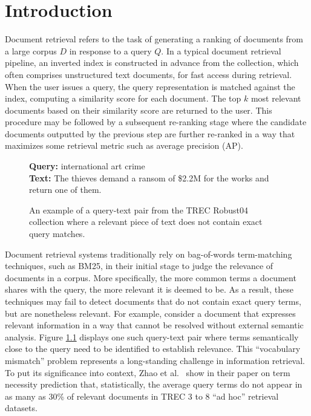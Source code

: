 \chapter{Introduction}
\label{intro}

Document retrieval refers to the task of generating a ranking of documents from a large corpus $ D $ in response to a query $ Q $.
In a typical document retrieval pipeline, an inverted index is constructed in advance from the collection, which often comprises unstructured text documents, for fast access during retrieval.
When the user issues a query, the query representation is matched against the index, computing a similarity score for each document.
The top $ k $ most relevant documents based on their similarity score are returned to the user.
This procedure may be followed by a subsequent re-ranking stage where the candidate documents outputted by the previous step are further re-ranked in a way that maximizes some retrieval metric such as average precision (AP).

\begin{figure}[b!]
	\begin{framed}
    		\textbf{Query:} international art crime \\
    		\textbf{Text:} The thieves demand a ransom of \$2.2M for the works and return one of them.
	\end{framed}
\label{query-sent-example}
 \caption{An example of a query-text pair from the TREC Robust04 collection where a relevant piece of text does not contain exact query matches.}
\end{figure}

Document retrieval systems traditionally rely on bag-of-words term-matching techniques, such as BM25, in their initial stage to judge the relevance of documents in a corpus.
More specifically, the more common terms a document shares with the query, the more relevant it is deemed to be.
As a result, these techniques may fail to detect documents that do not contain exact query terms, but are nonetheless relevant.
For example, consider a document that expresses relevant information in a way that cannot be resolved without external semantic analysis.
Figure \ref{query-sent-example} displays one such query-text pair where terms semantically close to the query need to be identified to establish relevance.
This ``vocabulary mismatch'' problem represents a long-standing challenge in information retrieval.
To put its significance into context, Zhao et al.~\cite{zhao2010term} show in their paper on term necessity prediction that, statistically, the average query terms do not appear in as many as 30\% of relevant documents in TREC 3 to 8 ``ad hoc'' retrieval datasets.


